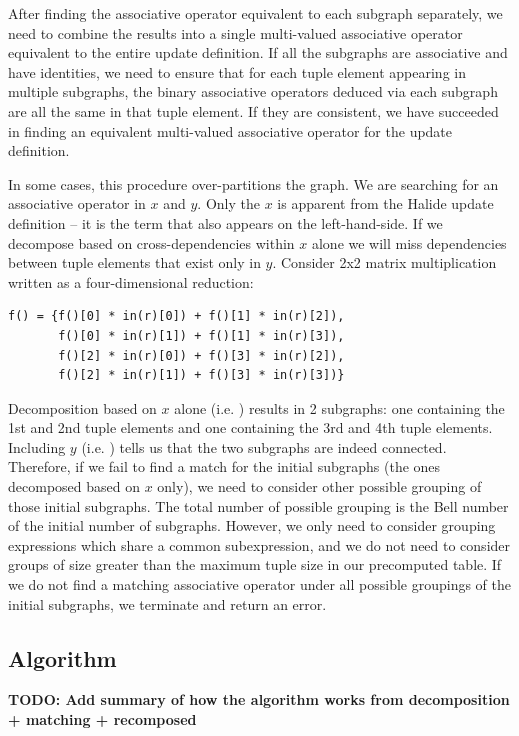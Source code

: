 After finding the associative operator equivalent to each subgraph separately, we need to combine the results into a single multi-valued associative operator equivalent to the entire update definition. If all the subgraphs are associative and have identities, we need to ensure that for each tuple element appearing in multiple subgraphs, the binary associative operators deduced via each subgraph are all the same in that tuple element. If they are consistent, we have succeeded in finding an equivalent multi-valued associative operator for the update definition.

In some cases, this procedure over-partitions the graph. We are searching for an associative operator in $x$ and $y$. Only the $x$ is apparent from the Halide update definition -- it is the term that also appears on the left-hand-side. If we decompose based on cross-dependencies within $x$ alone we will miss dependencies between tuple elements that exist only in $y$. Consider 2x2 matrix multiplication written as a four-dimensional reduction:

\begin{lstlisting}
f() = {f()[0] * in(r)[0]) + f()[1] * in(r)[2]),
       f()[0] * in(r)[1]) + f()[1] * in(r)[3]),
       f()[2] * in(r)[0]) + f()[3] * in(r)[2]),
       f()[2] * in(r)[1]) + f()[3] * in(r)[3])}
\end{lstlisting}

Decomposition based on $x$ alone (i.e. ) results in 2 subgraphs: one containing the 1st and 2nd tuple elements and one containing the 3rd and 4th tuple elements. Including $y$ (i.e. ) tells us that the two subgraphs are indeed connected. Therefore, if we fail to find a match for the initial subgraphs (the ones decomposed based on $x$ only), we need to consider other possible grouping of those initial subgraphs. The total number of possible grouping is the Bell number of the initial number of subgraphs. However, we only need to consider grouping expressions which share a common subexpression, and we do not need to consider groups of size greater than the maximum tuple size in our precomputed table. If we do not find a matching associative operator under all possible groupings of the initial subgraphs, we terminate and return an error.

\subsection{Algorithm}
\label{subsec:algorithm}

\textbf{TODO: Add summary of how the algorithm works from decomposition + matching + recomposed}
